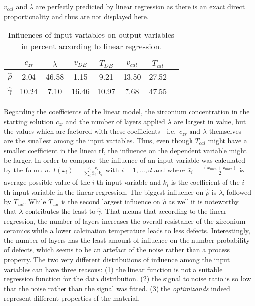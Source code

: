 $v_{cal}$ and $\lambda$ are perfectly predicted by linear regression as there is an exact direct proportionality and thus are not displayed here. 
%
\begin{table}[htb]
	\center
	\begin{tabular}{cccccccc}
		        & $c_{zr}$      & $\lambda$     & $v_{DB}$      & $T_{DB}$      & $v_{cal}$     & $T_{cal}$\\
				\hline\hline
				$\hat\rho$          &2.04   &46.58  &1.15   &9.21   &13.50  &27.52\\
				$\hat\gamma$        &10.24  &7.10   &16.46  &10.97  &7.68   &47.55\\
				\hline\hline
	\end{tabular}
	\label{tab:lin-reg-influence}
	\caption{Influences of input variables on output variables in percent according to linear regression.}
\end{table}

%
Regarding the coefficients of the linear model, the zirconium concentration in the starting solution $c_{zr}$ and the number of layers applied $\lambda$ are largest in value, but the values which are factored with these coefficients - i.e.\, $c_{zr}$ and $\lambda$ themselves -- are the smallest among the input variables. 
Thus, even though $T_{cal}$ might have a smaller coefficient in the linear \gls{rf}, the influence on the dependent variable might be larger. 
In order to compare, the influence of an input variable was calculated by the formula: $I(x_i)=\frac{\bar{x}_i \cdot k_i}{\sum_i \bar{x}_i \cdot k_i}$ with $i=1,\dots,d $ and where $\bar{x}_i= \frac{(x_{min}+x_{max})}{2}$ is average possible value of the $i$-th input variable and $k_i$ is the coefficient of the $i$-th input variable in the linear regression. 
The biggest influence on $\hat\rho$ is  $\lambda$, followed by $T_{cal}$. 
While $T_{cal}$ is the second largest influence on $\hat\rho$ as well it is noteworthy that $\lambda$ contributes the least to $\hat\gamma$. 
That means that according to the linear regression, the number of layers increases the overall resistance of the zirconium ceramics while a lower calcination temperature leads to less defects. 
Interestingly, the number of layers has the least amount of influence on the number probability of defects, which seems to be an artefact of the noise rather than a process property. 
The two very different distributions of influence among the input variables can have three reasons:
(1) the linear function is not a suitable regression function for the data distribution.
(2) the signal to noise ratio is so low that the noise rather than the signal was fitted.
(3) the \textit{optimizands} indeed represent different properties of the material.
%

